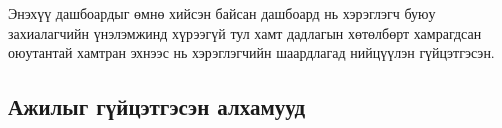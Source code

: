 Энэхүү дашбоардыг өмнө хийсэн байсан дашбоард нь хэрэглэгч буюу захиалагчийн үнэлэмжинд хүрээгүй тул хамт дадлагын хөтөлбөрт хамрагдсан оюутантай хамтран эхнээс нь хэрэглэгчийн шаардлагад нийцүүлэн гүйцэтгэсэн.

\subsection{Ажилыг гүйцэтгэсэн алхамууд}

	
